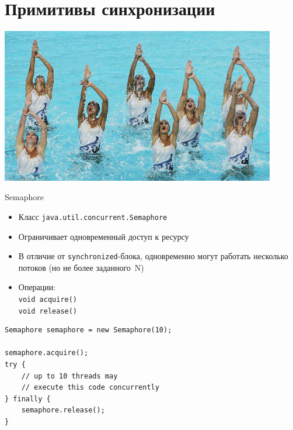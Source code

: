 \documentclass[unicode]{beamer}
\begin{document}
\section{Примитивы синхронизации}

\begin{frame}
\centering
\includegraphics[width=0.9\textwidth]{pics/synchronization.jpg}
\end{frame}


\begin{frame}{Semaphore}
\begin{itemize}
\item Класс \texttt{java.util.concurrent.Semaphore}
	\bigskip

\item Ограничивает одновременный доступ к ресурсу
	\bigskip

\item В отличие от \lstinline{synchronized}-блока, одновременно
	могут работать несколько потоков (но не более заданного~N)
	\bigskip

\item Операции:\\
	\lstinline{void acquire()}\\
	\lstinline{void release()}
\end{itemize}
\end{frame}


\begin{frame}[fragile]
\begin{lstlisting}
Semaphore semaphore = new Semaphore(10);

semaphore.acquire();
try {
    // up to 10 threads may
    // execute this code concurrently
} finally {
    semaphore.release();
}
\end{lstlisting}
\end{frame}
\end{document}
